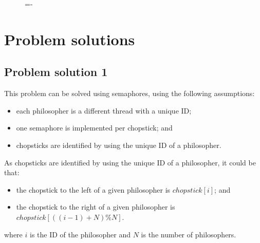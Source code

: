 \documentclass[a4paper]{systems-software}
\begin{document}
\begin{figure}[H]
  \lineskip=-\fboxrule
\end{figure}


\section*{Problem solutions}

\subsection*{Problem solution 1}

This problem can be solved using semaphores, using the following assumptions:
\begin{itemize}
	\item each philosopher is a different thread with a unique ID;
	\item one semaphore is implemented per chopstick; and
	\item chopsticks are identified by using the unique ID of a philosopher.
\end{itemize}

As chopsticks are identified by using the unique ID of a philosopher, it could be that:
\begin{itemize}
	\item the chopstick to the left of a given philosopher is $chopstick[i]$; and
	\item the chopstick to the right of a given philosopher is $chopstick[((i-1) + N) \% N].$
\end{itemize}
where $i$ is the ID of the philosopher and $N$ is the number of philosophers.
\end{document}
